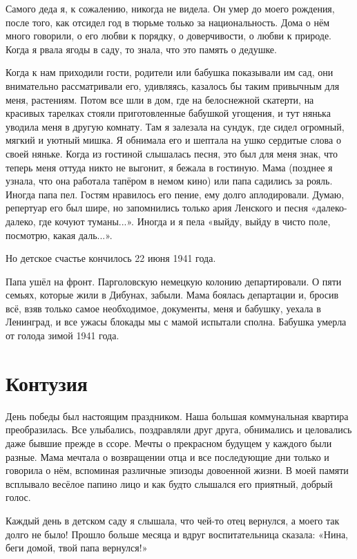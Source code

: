 Самого деда я, к сожалению, никогда не видела.
Он умер до моего рождения, после того, как отсидел год в тюрьме только за национальность.
Дома о нём много говорили, о его любви к порядку, о доверчивости, о любви к природе.
Когда я рвала ягоды в саду, то знала, что это память о дедушке.

Когда к нам приходили гости, родители или бабушка показывали им сад, они внимательно рассматривали его, удивляясь, казалось бы таким привычным для меня, растениям.
Потом все шли в дом, где на белоснежной скатерти, на красивых тарелках стояли приготовленные бабушкой угощения, и тут нянька уводила меня в другую комнату.
Там я залезала на сундук, где сидел огромный, мягкий и уютный мишка.
Я обнимала его и шептала на ушко сердитые слова о своей няньке.
Когда из гостиной слышалась песня, это был для меня знак, что теперь меня оттуда никто не выгонит, я бежала в гостиную.
Мама (позднее я узнала, что она работала тапёром в немом кино) или папа садились за рояль.
Иногда папа пел.
Гостям нравилось его пение, ему долго аплодировали.
Думаю, репертуар его был шире, но запомнились только ария Ленского и песня «далеко-далеко, где кочуют туманы...».
Иногда и я пела «выйду, выйду в чисто поле, посмотрю, какая даль...».

Но детское счастье кончилось 22 июня 1941 года.

Папа ушёл на фронт.
Парголовскую немецкую колонию департировали.
О пяти семьях, которые жили в Дибунах, забыли.
Мама боялась департации и, бросив всё, взяв только самое необходимое, документы, меня и бабушку, уехала в Ленинград, и все ужасы блокады мы с мамой испытали сполна.
Бабушка умерла от голода зимой 1941 года.

\section*{Контузия}

День победы был настоящим праздником.
Наша большая коммунальная квартира преобразилась.
Все улыбались, поздравляли друг друга, обнимались и целовались даже бывшие прежде в ссоре.
Мечты о прекрасном будущем у каждого были разные.
Мама мечтала о возвращении отца и все последующие дни только и говорила о нём, вспоминая различные эпизоды довоенной жизни.
В моей памяти всплывало весёлое папино лицо и как будто слышался его приятный, добрый голос.

Каждый день в детском саду я слышала, что чей-то отец вернулся, а моего так долго не было! 
Прошло больше месяца и вдруг воспитательница сказала: «Нина, беги домой, твой папа вернулся!»

